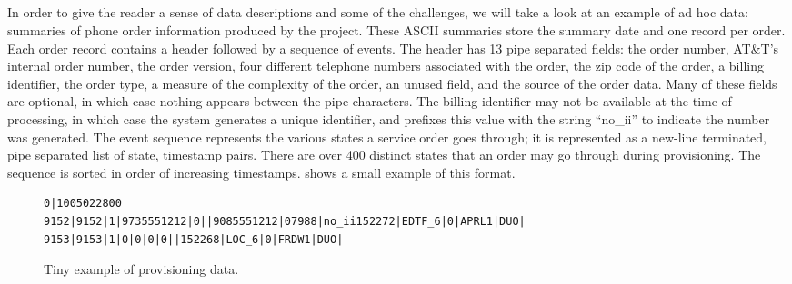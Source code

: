 \subsection{\dibbler{}}
In order
to give the reader a sense of data descriptions
and some of the challenges, we will take a look at an example of ad
hoc data: summaries of phone order information produced by the
\dibbler{} project.
These ASCII summaries store the summary date and one record per order.
Each order record contains a header followed by a sequence of events.
The header has 13 pipe separated fields: the order number, AT\&T's
internal order number, the order version, four different telephone
numbers associated with the order, the zip code of the order, a
billing identifier, the order type, a measure of the complexity of the
order, an unused field, and the source of the order data.  Many of
these fields are optional, in which case nothing appears between the
pipe characters.  The billing identifier may not be available at the
time of processing, in which case the system generates a unique
identifier, and prefixes this value with the string ``no\_ii'' to
indicate the number was generated. The event sequence represents the
various states a service order goes through; it is represented as a
new-line terminated, pipe separated list of state, timestamp pairs.
There are over 400 distinct states that an order may go through during
provisioning.  The sequence is sorted in order of increasing timestamps. 
 shows a small example of
this format.


\begin{figure*}
\begin{small}
\begin{verbatim}
0|1005022800
9152|9152|1|9735551212|0||9085551212|07988|no_ii152272|EDTF_6|0|APRL1|DUO|
9153|9153|1|0|0|0|0||152268|LOC_6|0|FRDW1|DUO|
\end{verbatim}
\caption{Tiny example of \dibbler{} provisioning data.}
\label{figure:dibbler-records}
\end{small}
\end{figure*}

